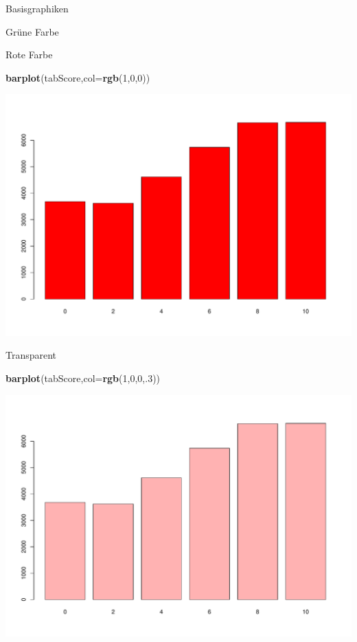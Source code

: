 \documentclass[ignorenonframetext,]{beamer}
\newenvironment{Shaded}{}{}
\newcommand{\KeywordTok}[1]{\textcolor[rgb]{0.00,0.44,0.13}{\textbf{{#1}}}}
\newcommand{\DataTypeTok}[1]{\textcolor[rgb]{0.56,0.13,0.00}{{#1}}}
\newcommand{\DecValTok}[1]{\textcolor[rgb]{0.25,0.63,0.44}{{#1}}}
\newcommand{\NormalTok}[1]{{#1}}
\begin{document}
\begin{frame}[fragile]{Basisgraphiken}
\begin{block}{Grüne Farbe}
\end{block}

\begin{block}{Rote Farbe}

\begin{Shaded}
\begin{Highlighting}[]
\KeywordTok{barplot}\NormalTok{(tabScore,}\DataTypeTok{col=}\KeywordTok{rgb}\NormalTok{(}\DecValTok{1}\NormalTok{,}\DecValTok{0}\NormalTok{,}\DecValTok{0}\NormalTok{))}
\end{Highlighting}
\end{Shaded}

\includegraphics{R_intern_files/figure-beamer/unnamed-chunk-158-1.pdf}

\end{block}

\begin{block}{Transparent}

\begin{Shaded}
\begin{Highlighting}[]
\KeywordTok{barplot}\NormalTok{(tabScore,}\DataTypeTok{col=}\KeywordTok{rgb}\NormalTok{(}\DecValTok{1}\NormalTok{,}\DecValTok{0}\NormalTok{,}\DecValTok{0}\NormalTok{,.}\DecValTok{3}\NormalTok{))}
\end{Highlighting}
\end{Shaded}

\includegraphics{R_intern_files/figure-beamer/unnamed-chunk-159-1.pdf}


\end{block}
\end{frame}
\end{document}
